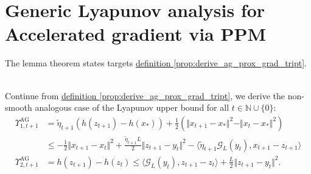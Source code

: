 \documentclass[12pt]{article}
\begin{document}
\section{Generic Lyapunov analysis for Accelerated gradient via PPM}
\label{sec:generic_ag_ppm_lyapunov_analysis}
    The lemma theorem states targets
    \hyperref[prop:derive_ag_prox_grad_tript]
    {definition \ref*{prop:derive_ag_prox_grad_tript}}. 

    \begin{lemma}
    \label{lemma:nsmooth_agg_lyapunov_upper_bound}\;\\
        Continue from 
        \hyperref[prop:derive_ag_prox_grad_tript]
        {definition \ref*{prop:derive_ag_prox_grad_tript}},
        we derive the non-smooth analogous case of the Lyapunov upper bound for all $t \in \mathbb N \cup \{0\}$: 
        \begin{align*}
            \Upsilon_{1, t + 1}^\text{AG}
            &= 
            \tilde\eta_{t + 1} (h(z_{t + 1}) - h(x_*)) + 
            \frac{1}{2} (
                \Vert x_{t + 1} - x_*\Vert^2
                - 
                \Vert x_t - x_*\Vert^2
            )
            \\
            &\le 
            - \frac{1}{2}\Vert x_{t + 1} - x_t\Vert^2 
            + \frac{\tilde\eta_{t + 1}L}{2}\Vert z_{t + 1} - y_t\Vert^2
            - \langle 
                \tilde\eta_{t + 1} \mathcal G_L(y_t), 
                x_{t + 1} - z_{t + 1}
            \rangle
            \\
            \Upsilon_{2, t + 1}^\text{AG}
            &= 
            h(z_{t + 1}) - h(z_t) 
            \le 
            \langle \mathcal G_L(y_t), z_{t + 1} - z_t\rangle + 
            \frac{L}{2}\Vert z_{t + 1} - y_t\Vert^2. 
        \end{align*}
    \end{lemma}
\end{document}
